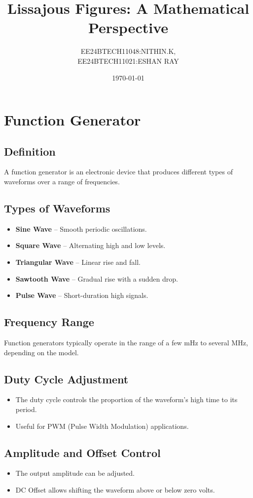\documentclass{article}
\title{Lissajous Figures: A Mathematical Perspective}
\author{EE24BTECH11048:NITHIN.K,\\EE24BTECH11021:ESHAN RAY}
\date{\today}
\begin{document}
\maketitle
\section{Function Generator}

\subsection{Definition}
A function generator is an electronic device that produces different types of waveforms over a range of frequencies.

\subsection{Types of Waveforms}
\begin{itemize}
    \item \textbf{Sine Wave} – Smooth periodic oscillations.
    \item \textbf{Square Wave} – Alternating high and low levels.
    \item \textbf{Triangular Wave} – Linear rise and fall.
    \item \textbf{Sawtooth Wave} – Gradual rise with a sudden drop.
    \item \textbf{Pulse Wave} – Short-duration high signals.
\end{itemize}

\subsection{Frequency Range}
Function generators typically operate in the range of a few mHz to several MHz, depending on the model.

\subsection{Duty Cycle Adjustment}
\begin{itemize}
    \item The duty cycle controls the proportion of the waveform's high time to its period.
    \item Useful for PWM (Pulse Width Modulation) applications.
\end{itemize}

\subsection{Amplitude and Offset Control}
\begin{itemize}
    \item The output amplitude can be adjusted.
    \item DC Offset allows shifting the waveform above or below zero volts.
\end{itemize}
\end{document}
